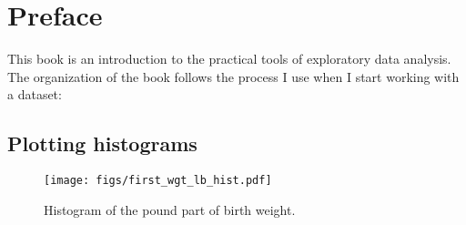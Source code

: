 \documentclass[12pt]{book}
\begin{document}
\chapter{Preface}%
\label{preface}

This book is an introduction to the practical tools of exploratory data analysis.  The
organization of the book follows the process I use when I start working with a dataset:

\section{Plotting histograms}%

\begin{figure}
\centerline{\texttt{[image: figs/first\_wgt\_lb\_hist.pdf]}}
\caption{Histogram of the pound part of birth weight.}%
\label{first_wgt_lb_hist}
\end{figure}
\end{document}
